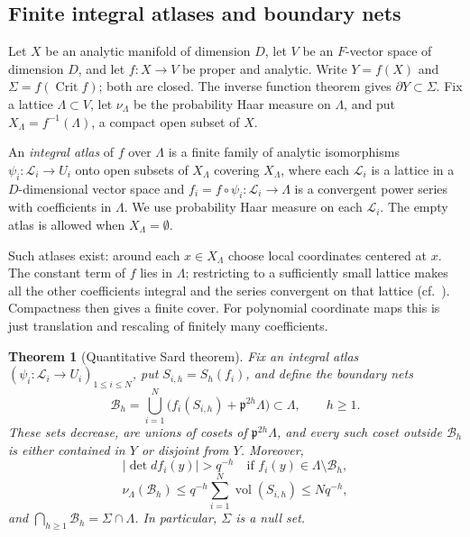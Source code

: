 \documentclass[11pt,reqno]{amsart}
\numberwithin{equation}{section}
\theoremstyle{plain}
\newtheorem{theorem}{Theorem}[section]
\theoremstyle{definition}
\theoremstyle{remark}
\theoremstyle{plain}
\newcommand{\pp}{\mathfrak{p}}   %
\newcommand{\Lat}{\mathcal{L}}   %
\newcommand{\dLat}{\Lambda}      %
\newcommand{\g}{\mathfrak{g}}    %
\newcommand{\gd}{\mathfrak{g}^*} %
\newcommand{\Bad}{\mathcal{B}}   %
\newcommand{\bnets}{boundary nets}
\newcommand{\abs}[1]{\lvert#1\rvert}
\DeclareMathOperator{\vol}{vol}
\DeclareMathOperator{\Crit}{Crit}
\newcommand{\Crv}{\Sigma}
\newcommand{\Vf}{Y}
\newcommand{\XL}{X_{\dLat}}
\newcommand{\iatlas}{integral atlas}
\begin{document}
\subsection{Finite integral atlases and \bnets{}}\label{sec:bnets}
Let $X$ be an analytic manifold of dimension $D$, let $V$ be an
$F$-vector space of dimension $D$, and let $f:X\to V$ be proper and
analytic. Write $\Vf=f(X)$ and $\Crv=f(\Crit f)$; both are closed.
The inverse function theorem gives $\partial\Vf\subset\Crv$.
Fix a lattice $\dLat\subset V$, let $\nu_{\dLat}$ be the probability Haar measure on $\dLat$, and put
$\XL=f^{-1}(\dLat)$, a compact open subset of $X$.

An \emph{\iatlas{}} of $f$ over $\dLat$ is a finite family of analytic
isomorphisms $\psi_i:\Lat_i\to U_i$ onto open subsets of $\XL$
covering $\XL$, where each $\Lat_i$ is a lattice in a
$D$-dimensional vector space and
$f_i=f\circ\psi_i:\Lat_i\to\dLat$ is a convergent power series with
coefficients in $\dLat$. We use probability Haar measure on each
$\Lat_i$. The empty atlas is allowed when $\XL=\emptyset$.

Such atlases exist: around each $x\in\XL$ choose local coordinates
centered at $x$. The constant term of $f$ lies in $\dLat$; restricting
to a sufficiently small lattice makes all the other coefficients
integral and the series convergent on that lattice
(cf.\ \cite[Lemma~7.4.3(i)]{MR1743467}). Compactness then gives a finite
cover. For polynomial coordinate maps this is just translation and
rescaling of finitely many coefficients.

\begin{theorem}[Quantitative Sard theorem]\label{thm:sard}
Fix an \iatlas{} $(\psi_i:\Lat_i\to U_i)_{1\le i\le N}$, put
$S_{i,h}=S_h(f_i)$, and define the \emph{\bnets{}}
\begin{equation}\label{eq:badf}
\Bad_h=\bigcup_{i=1}^N\bigl(f_i(S_{i,h})+\pp^{2h}\dLat\bigr)
\subset\dLat,\qquad h\ge1.
\end{equation}
These sets decrease, are unions of cosets of $\pp^{2h}\dLat$, and
every such coset outside $\Bad_h$ is either contained in $\Vf$ or
disjoint from $\Vf$. Moreover,
\begin{equation}\label{eq:sardchart}
\abs{\det df_i(y)}>q^{-h}
\quad\text{if }f_i(y)\in\dLat\setminus\Bad_h,
\end{equation}
\begin{equation}\label{eq:sardmeasure}
\nu_{\dLat}(\Bad_h)\le q^{-h}\sum_{i=1}^N\vol(S_{i,h})\le Nq^{-h},
\end{equation}
and $\bigcap_{h\ge1}\Bad_h=\Crv\cap\dLat$. In particular,
$\Crv$ is a null set.
\end{theorem}
\end{document}

